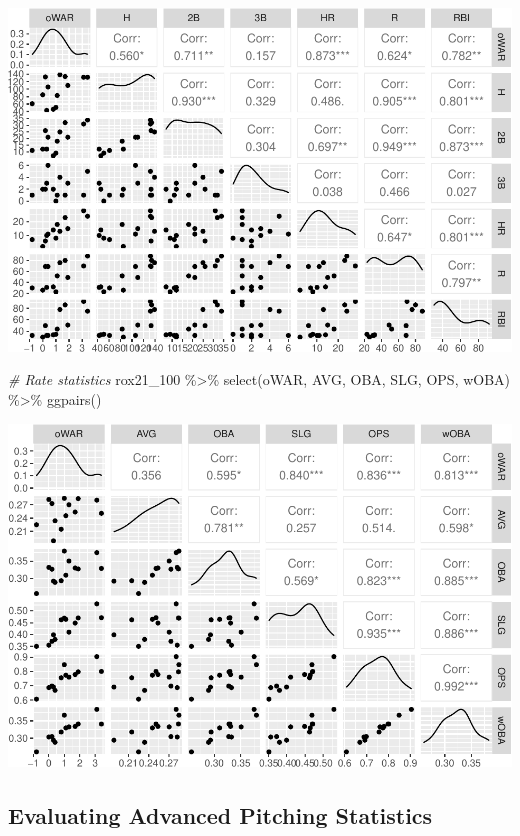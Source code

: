 \documentclass[
  11pt,
]{book}
\newenvironment{Shaded}{\begin{snugshade}}{\end{snugshade}}
\newcommand{\CommentTok}[1]{\textcolor[rgb]{0.56,0.35,0.01}{\textit{#1}}}
\newcommand{\FunctionTok}[1]{\textcolor[rgb]{0.00,0.00,0.00}{#1}}
\newcommand{\NormalTok}[1]{#1}
\newcommand{\SpecialCharTok}[1]{\textcolor[rgb]{0.00,0.00,0.00}{#1}}
\theoremstyle{definition}
\theoremstyle{definition}
\theoremstyle{definition}
\theoremstyle{definition}
\theoremstyle{remark}
\begin{document}
\includegraphics{series_files/figure-latex/unnamed-chunk-16-1.pdf}

\begin{Shaded}
\begin{Highlighting}[]
\CommentTok{\# Rate statistics}
\NormalTok{rox21\_100 }\SpecialCharTok{\%\textgreater{}\%}
    \FunctionTok{select}\NormalTok{(oWAR, AVG, OBA, SLG, OPS, wOBA) }\SpecialCharTok{\%\textgreater{}\%}
    \FunctionTok{ggpairs}\NormalTok{()}
\end{Highlighting}
\end{Shaded}

\includegraphics{series_files/figure-latex/unnamed-chunk-16-2.pdf}

\newpage

\hypertarget{evaluating-advanced-pitching-statistics}{%
\subsection{Evaluating Advanced Pitching Statistics}\label{evaluating-advanced-pitching-statistics}}
\end{document}
